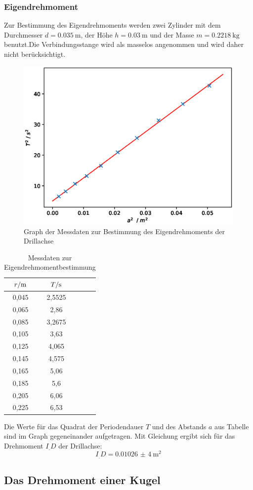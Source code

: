 \subsubsection{Eigendrehmoment}
Zur Bestimmung des Eigendrehmoments werden zwei Zylinder mit dem Durchmesser $d = \SI{0,035}{\metre}$, der Höhe $h = \SI{0,03}{\metre}$ und der Masse $m = \SI{0,2218}{\kilogram}$ benutzt.\newline Die Verbindungsstange wird als masselos angenommen und wird daher nicht berücksichtigt.
\begin{figure}
\centering
\includegraphics[scale = .75,keepaspectratio]
	{content/images/plot1.eps}
\caption{Graph der Messdaten zur Bestimmung des Eigendrehmoments der Drillachse}%
\end{figure}
\begin{table}
	\centering
	\caption{Messdaten zur Eigendrehmomentbestimmung}
	\begin{tabular}{S[table-format=3.2] S[table-format=3.2]S[table-format=3.2]S[table-format=3.2]}
		\toprule
		{$r/\si[per-mode=reciprocal]{\metre}$}&{$T/\si[per-mode=reciprocal]{\second}$} \\
		,045 & 2,5525 \\
		0,065 & 2,86 \\
		0,085 & 3,2675 \\
		0,105 & 3,63 \\
		0,125 & 4,065 \\
		0,145 & 4,575 \\
		0,165 & 5,06 \\
		0,185 & 5,6 \\
		0,205 & 6,06 \\
		0,225 & 6,53 \\
		\bottomrule
	\end{tabular}
\end{table}
Die Werte für das Quadrat der Periodendauer $T$ und des Abstands $a$ aus Tabelle %
sind im Graph %
gegeneinander aufgetragen.
Mit Gleichung %
ergibt sich für das Drehmoment $I_.D$ der Drillachse:
\[I_.D=\SI{0,01026(4)}{\metre\squared}\]
\subsection{Das Drehmoment einer Kugel}
